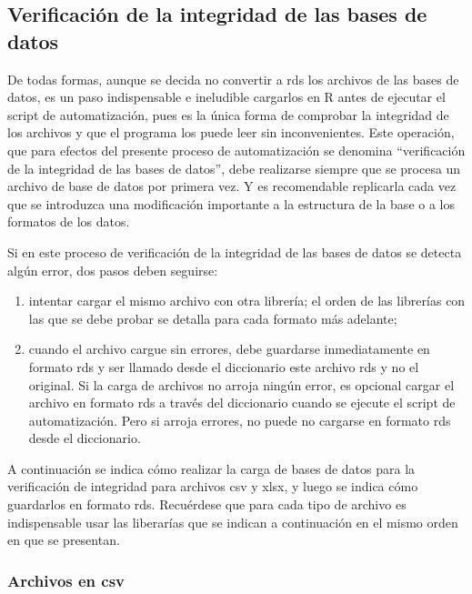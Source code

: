 \documentclass[
  spanish,
]{book}
\begin{document}
\hypertarget{verificaciuxf3n-de-la-integridad-de-las-bases-de-datos}{%
\subsection{Verificación de la integridad de las bases de datos}\label{verificaciuxf3n-de-la-integridad-de-las-bases-de-datos}}

De todas formas, aunque se decida no convertir a rds los archivos de las bases de datos, es un paso indispensable e ineludible cargarlos en R antes de ejecutar el script de automatización, pues es la única forma de comprobar la integridad de los archivos y que el programa los puede leer sin inconvenientes. Este operación, que para efectos del presente proceso de automatización se denomina ``verificación de la integridad de las bases de datos'', debe realizarse siempre que se procesa un archivo de base de datos por primera vez. Y es recomendable replicarla cada vez que se introduzca una modificación importante a la estructura de la base o a los formatos de los datos.

Si en este proceso de verificación de la integridad de las bases de datos se detecta algún error, dos pasos deben seguirse:

\begin{enumerate}
\def\labelenumi{\roman{enumi})}
\item
  intentar cargar el mismo archivo con otra librería; el orden de las librerías con las que se debe probar se detalla para cada formato más adelante;
\item
  cuando el archivo cargue sin errores, debe guardarse inmediatamente en formato rds y ser llamado desde el diccionario este archivo rds y no el original. Si la carga de archivos no arroja ningún error, es opcional cargar el archivo en formato rds a través del diccionario cuando se ejecute el script de automatización. Pero si arroja errores, no puede no cargarse en formato rds desde el diccionario.
\end{enumerate}

A continuación se indica cómo realizar la carga de bases de datos para la verificación de integridad para archivos csv y xlsx, y luego se indica cómo guardarlos en formato rds. Recuérdese que para cada tipo de archivo es indispensable usar las liberarías que se indican a continuación en el mismo orden en que se presentan.

\hypertarget{archivos-en-csv}{%
\subsubsection{Archivos en csv}\label{archivos-en-csv}}
\end{document}
